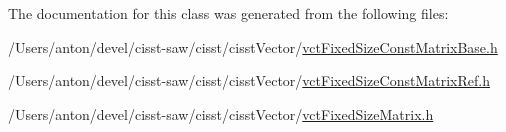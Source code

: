 The documentation for this class was generated from the following files\+:\begin{DoxyCompactItemize}
\item 
/\+Users/anton/devel/cisst-\/saw/cisst/cisst\+Vector/\hyperlink{vct_fixed_size_const_matrix_base_8h}{vct\+Fixed\+Size\+Const\+Matrix\+Base.\+h}\item 
/\+Users/anton/devel/cisst-\/saw/cisst/cisst\+Vector/\hyperlink{vct_fixed_size_const_matrix_ref_8h}{vct\+Fixed\+Size\+Const\+Matrix\+Ref.\+h}\item 
/\+Users/anton/devel/cisst-\/saw/cisst/cisst\+Vector/\hyperlink{vct_fixed_size_matrix_8h}{vct\+Fixed\+Size\+Matrix.\+h}\end{DoxyCompactItemize}
